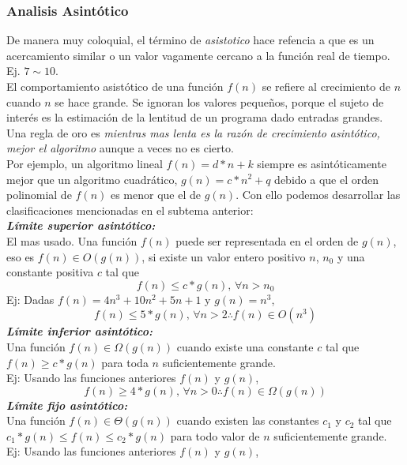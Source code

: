 \documentclass[letterpaper, 12pt]{article}
\begin{document}
\begin{justify}
        \subsubsection{Analisis Asintótico}
        De manera muy coloquial, el término de \emph{asistotico} hace refencia a que es un acercamiento similar o un valor vagamente cercano a la función real de tiempo. Ej. \(7\sim10\).
        \\ \newline
        El comportamiento asistótico de una función \(f(n)\) se refiere al crecimiento de \(n\) cuando \(n\) se hace grande. Se ignoran los valores pequeños, porque el sujeto de interés es la estimación de la lentitud de un programa dado entradas grandes.
        Una regla de oro es \emph{mientras mas lenta es la razón de crecimiento asintótico, mejor el algoritmo} aunque a veces no es cierto.\\ \newline
        Por ejemplo, un algoritmo lineal \(f(n)=d*n+k\) siempre es asintóticamente mejor que un algoritmo cuadrático, \(g(n)=c*n^2+q\) debido a que el orden polinomial de \(f(n)\) es menor que el de \(g(n)\). Con ello podemos desarrollar las clasificaciones mencionadas en el subtema anterior:
        \\ \newline
        \textbf{\emph{Límite superior asintótico:}}\\
        El mas usado. Una función \(f(n)\) puede ser representada en el orden de \(g(n)\), eso es \(f(n)\in O(g(n))\), si existe un valor entero positivo \(n\), \(n_0\) y una constante positiva \(c\) tal que
        \[f(n)\leq c*g(n),\, \forall n>n_0\]
        Ej: Dadas \(f(n)=4n^3+10n^2+5n+1\) y \(g(n)=n^3\),
        \[f(n)\leq 5*g(n),\, \forall n>2 \therefore f(n)\in O(n^3)\]
        \textbf{\emph{Límite inferior asintótico:}}\\
        Una función \(f(n)\in\Omega (g(n))\) cuando existe una constante \(c\) tal que \(f(n)\geq c*g(n)\) para toda \(n\) suficientemente grande.\\
        Ej: Usando las funciones anteriores \(f(n)\) y \(g(n)\),
        \[f(n)\geq 4*g(n),\, \forall n>0\therefore f(n)\in \Omega (g(n))\]
        \textbf{\emph{Límite fijo asintótico:}}\\
        Una función \(f(n)\in \Theta (g(n))\) cuando existen las constantes \(c_1\) y \(c_2\) tal que \(c_1*g(n)\leq f(n)\leq c_2*g(n)\) para todo valor de \(n\) suficientemente grande.\\
        Ej: Usando las funciones anteriores \(f(n)\) y \(g(n)\),

\end{justify}
\end{document}

